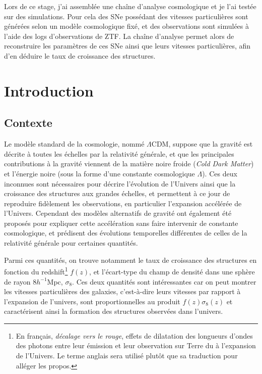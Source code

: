 \documentclass{book}
\begin{document}
Lors de ce stage, j'ai assemblée une chaîne d'analyse cosmologique et je l'ai testée sur des simulations. Pour cela des SNe possédant des vitesses particulières sont générées selon un modèle cosmologique fixé, et des observations sont simulées à l'aide des logs d'observations de ZTF. La chaîne d'analyse permet alors de reconstruire les paramètres de ces SNe ainsi que leurs vitesses particulières, afin d'en déduire le taux de croissance des structures.

\chapter{Introduction}

\section{Contexte}

Le modèle standard de la cosmologie, nommé $\Lambda$CDM, suppose que la gravité est décrite à toutes les échelles par la relativité générale, et que les principales contributions à la gravité viennent de la matière noire froide (\textit{Cold Dark Matter}) et l'énergie noire (sous la forme d'une constante cosmologique $\Lambda$). Ces deux inconnues sont nécessaires pour décrire l'évolution de l'Univers ainsi que la croissance des structures aux grandes échelles, et permettent à ce jour de reproduire fidèlement les observations, en particulier l'expansion accélérée de l'Univers. Cependant des modèles alternatifs de gravité ont également été proposés pour expliquer cette accélération sans faire intervenir de constante cosmologique, et prédisent des évolutions temporelles différentes de celles de la relativité générale pour certaines quantités.

Parmi ces quantités, on trouve notamment le taux de croissance des structures en fonction du redshift\footnote{En français, \textit{décalage vers le rouge}, effets de dilatation des longueurs d'ondes des photons entre leur émission et leur observation sur Terre du à l'expansion de l'Univers. Le terme anglais sera utilisé plutôt que sa traduction pour alléger les propos.} $f(z)$, et l'écart-type du champ de densité dans une sphère de rayon 8$h^{-1}$Mpc, $\sigma_8$. Ces deux quantités sont intéressantes car on peut montrer les vitesses particulières des galaxies, c'est-à-dire leurs vitesses par rapport à l'expansion de l'univers, sont proportionnelles au produit $f(z)\sigma_8(z)$ et caractérisent ainsi la formation des structures observées dans l'univers.
\end{document}
